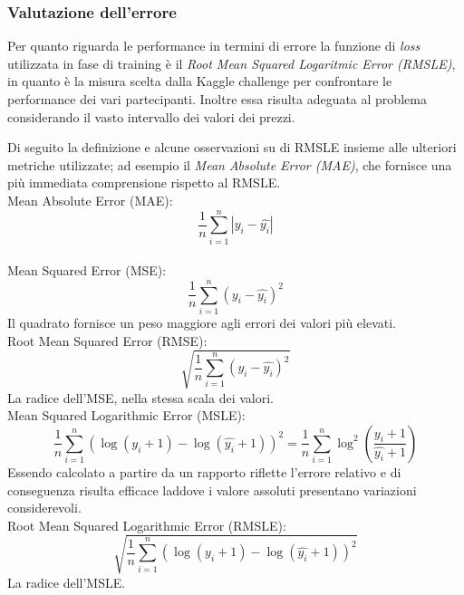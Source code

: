\subsubsection{Valutazione dell'errore}

Per quanto riguarda le performance in termini di errore la funzione di
\textit{loss} utilizzata in fase di training è il \textit{Root Mean Squared
Logaritmic Error (RMSLE)}, in quanto è la misura scelta dalla Kaggle challenge
per confrontare le performance dei vari partecipanti. Inoltre essa risulta
adeguata al problema considerando il vasto intervallo dei valori dei prezzi.

Di seguito la definizione e alcune osservazioni su di RMSLE insieme alle
ulteriori metriche utilizzate; ad esempio il \textit{Mean Absolute Error (MAE)},
che fornisce una più immediata comprensione rispetto al RMSLE. \\
Mean Absolute Error (MAE):
\begin{equation}
    \frac{1}{n} \sum_{i=1}^{n} | y_i - \hat{y_i} |
\end{equation}
\\
Mean Squared Error (MSE):
\begin{equation}
    \frac{1}{n} \sum_{i=1}^{n} ( y_i - \hat{y_i} )^2
\end{equation}
Il quadrato fornisce un peso maggiore agli errori dei valori più elevati\cite{rmse-or-mae}.
\\
Root Mean Squared Error (RMSE):
\begin{equation}
    \sqrt{ \frac{1}{n} \sum_{i=1}^{n} ( y_i - \hat{y_i} )^2}
\end{equation}
La radice dell'MSE, nella stessa scala dei valori.
\\
Mean Squared Logarithmic Error (MSLE):
\begin{equation}
    \frac{1}{n}
        \sum_{i=1}^{n}
            ( \log(y_i+1) - \log(\hat{y_i}+1) )^2
    =
    \frac{1}{n}
        \sum_{i=1}^{n}
            \log^2(\frac{y_i+1}{\hat{y_i}+1})
\end{equation}
Essendo calcolato a partire da un rapporto riflette l'errore relativo e di
conseguenza risulta efficace laddove i valore assoluti presentano variazioni considerevoli.
\\
Root Mean Squared Logarithmic Error (RMSLE):
\begin{equation}
    \sqrt{ 
        \frac{1}{n}
            \sum_{i=1}^{n}
                ( \log(y_i+1) - \log(\hat{y_i}+1) )^2
    }
\end{equation}
La radice dell'MSLE.

